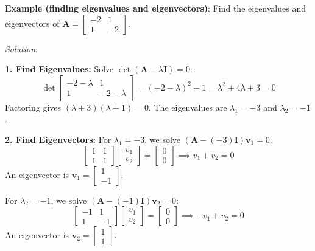 \begin{exampleBox}
    \textbf{Example (finding eigenvalues and eigenvectors)}: Find the eigenvalues and eigenvectors of $\mathbf{A} = \begin{bmatrix} -2 & 1 \\ 1 & -2 \end{bmatrix}$.

    \emph{Solution}:

    \textbf{1. Find Eigenvalues:}
    Solve $\det(\mathbf{A} - \lambda \mathbf{I}) = 0$:
    $$ \det \begin{bmatrix} -2-\lambda & 1 \\ 1 & -2-\lambda \end{bmatrix} = (-2-\lambda)^2 - 1 = \lambda^2 + 4\lambda + 3 = 0 $$
    Factoring gives $(\lambda+3)(\lambda+1)=0$. The eigenvalues are $\lambda_1 = -3$ and $\lambda_2 = -1$.

    \textbf{2. Find Eigenvectors:}
    For $\lambda_1 = -3$, we solve $(\mathbf{A} - (-3)\mathbf{I})\mathbf{v}_1 = 0$:
    $$ \begin{bmatrix} 1 & 1 \\ 1 & 1 \end{bmatrix} \begin{bmatrix} v_1 \\ v_2 \end{bmatrix} = \begin{bmatrix} 0 \\ 0 \end{bmatrix} \implies v_1 + v_2 = 0 $$
    An eigenvector is $\mathbf{v}_1 = \begin{bmatrix} 1 \\ -1 \end{bmatrix}$.

    For $\lambda_2 = -1$, we solve $(\mathbf{A} - (-1)\mathbf{I})\mathbf{v}_2 = 0$:
    $$ \begin{bmatrix} -1 & 1 \\ 1 & -1 \end{bmatrix} \begin{bmatrix} v_1 \\ v_2 \end{bmatrix} = \begin{bmatrix} 0 \\ 0 \end{bmatrix} \implies -v_1 + v_2 = 0 $$
    An eigenvector is $\mathbf{v}_2 = \begin{bmatrix} 1 \\ 1 \end{bmatrix}$.
\end{exampleBox}

